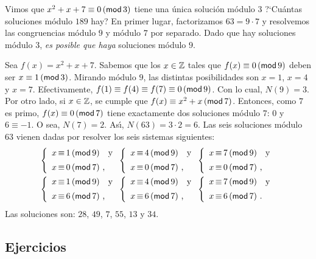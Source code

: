 \begin{ejemChino}\label{ejem:chino:polinomial:veinticiete}
	Vimos que $x^2+x+7\equiv 0\tmodulo[3]$ tiene una \'unica
	soluci\'on m\'odulo $3$ ?`Cu\'antas soluciones m\'odulo $189$ hay?
	En primer lugar, factorizamos $63=9\cdot 7$ y resolvemos
	las congruencias m\'odulo $9$ y m\'odulo $7$ por separado.
	Dado que hay soluciones m\'odulo $3$, \emph{es posible que haya}
	soluciones m\'odulo $9$.

	Sea $f(x)=x^2+x+7$. Sabemos que los $x\in\Enteros$ tales que
	$f(x)\equiv 0\tmodulo[9]$ deben ser $x\equiv 1\tmodulo[3]$.
	Mirando m\'odulo $9$, las distintas posibilidades son
	$x=1$, $x=4$ y $x=7$. Efectivamente,
	$f(1)\equiv f(4)\equiv f(7)\equiv 0\tmodulo[9]$.
	Con lo cual, $N(9)=3$.
	Por otro lado, si $x\in\Enteros$, se cumple que
	$f(x)\equiv x^2+x\tmodulo[7]$. Entonces, como $7$ es primo,
	$f(x)\equiv 0\tmodulo[7]$ tiene exactamente dos soluciones
	m\'odulo $7$: $0$ y $6\equiv -1$. O sea, $N(7)=2$.
	As\'{\i}, $N(63)=3\cdot 2=6$. Las seis soluciones m\'odulo $63$
	vienen dadas por resolver los seis sistemas siguientes:
	\begin{displaymath}
		\begin{aligned}
			\left\{
			\begin{array}{r@{\,\equiv\,}l}
				x & 1 \tmodulo[9] \dispand \\[5pt]
				x & 0 \tmodulo[7] \dispcomma
			\end{array}
			\right.
			\left\{
			\begin{array}{r@{\,\equiv\,}l}
				x & 4 \tmodulo[9] \dispand \\[5pt]
				x & 0 \tmodulo[7] \dispcomma
			\end{array}
			\right.
			\left\{
			\begin{array}{r@{\,\equiv\,}l}
				x & 7 \tmodulo[9] \dispand \\[5pt]
				x & 0 \tmodulo[7] \dispcomma
			\end{array}
			\right. \\
			\left\{
			\begin{array}{r@{\,\equiv\,}l}
				x & 1 \tmodulo[9] \dispand \\[5pt]
				x & 6 \tmodulo[7] \dispcomma
			\end{array}
			\right.
			\left\{
			\begin{array}{r@{\,\equiv\,}l}
				x & 4 \tmodulo[9] \dispand \\[5pt]
				x & 6 \tmodulo[7] \dispcomma
			\end{array}
			\right.
			\left\{
			\begin{array}{r@{\,\equiv\,}l}
				x & 7 \tmodulo[9] \dispand \\[5pt]
				x & 6 \tmodulo[7] \dispstop
			\end{array}
			\right.
		\end{aligned}
	\end{displaymath}
	Las soluciones son: $28$, $49$, $7$, $55$, $13$ y $34$.
\end{ejemChino}

\subsection*{Ejercicios}


